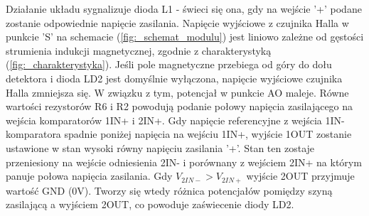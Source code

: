 \documentclass[11pt, a4paper]{article}
\begin{document}
\vspace{0.25cm}
Działanie układu sygnalizuje dioda L1 - świeci się ona, gdy na wejście '+' podane zostanie odpowiednie napięcie zasilania. Napięcie wyjściowe z czujnika Halla w punkcie 'S' na schemacie (\ref{fig:_schemat_modulu}) jest liniowo zależne od gęstości strumienia indukcji magnetycznej, zgodnie z charakterystyką (\ref{fig:_charakterystyka}). Jeśli pole magnetyczne przebiega od góry do dołu detektora i dioda LD2 jest domyślnie wyłączona, napięcie wyjściowe czujnika Halla zmniejsza się. W związku z tym, potencjał w punkcie AO maleje. Równe wartości rezystorów R6 i R2 powodują podanie połowy napięcia zasilającego na wejścia komparatorów 1IN+ i 2IN+. Gdy napięcie referencyjne z wejścia 1IN- komparatora spadnie poniżej napięcia na wejściu 1IN+, wyjście 1OUT zostanie ustawione w stan wysoki równy napięciu zasilania '+'. Stan ten zostaje przeniesiony na wejście odniesienia 2IN- i porównany z wejściem 2IN+ na którym panuje połowa napięcia zasilania. Gdy $V_{2IN-} > V_{2IN+}$ wyjście 2OUT przyjmuje wartość GND (0V). Tworzy się wtedy różnica potencjałów pomiędzy szyną zasilającą a wyjściem 2OUT, co powoduje zaświecenie diody LD2.


\newpage
\end{document}
